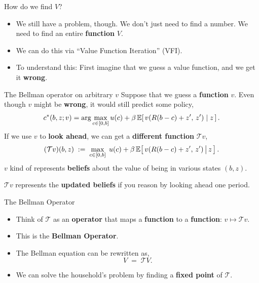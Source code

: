 \documentclass[10pt,aspectratio=169]{beamer}
\begin{document}
\begin{frame}{How do we find $V$?}
  \begin{itemize}
    \item We still have a problem, though. We don't just need to find a number. We need to find an entire \textbf{function} $V$.
    \item We can do this via ``Value Function Iteration'' (VFI).
    \item To understand this: First imagine that we guess a value function, and we get it \textbf{wrong}.
  \end{itemize}

\end{frame}

\begin{frame}{The Bellman operator on arbitrary $v$}
  Suppose that we guess a \textbf{function} $v$. Even though $v$ might be \textbf{wrong}, it would still predict some policy,
  \[
    c^*(b, z; v) = \arg\max_{c \in [0, b]} u(c) + \beta \, \mathbb{E}\!\left[\, v(R(b-c) + z',\, z') \mid z \,\right].
  \]
  If we use $v$ to \textbf{look ahead}, we can get a \textbf{different function} $\mathcal{T}v$,
  \[
    (\mathcal{T} v)(b, z) \;:=\; \max_{c \in [0, b]} \; u(c) + \beta \, \mathbb{E}\!\left[\, v(R(b-c) + z',\, z') \,\big|\, z \,\right].
  \]
  $v$ kind of represents \textbf{beliefs} about the value of being in various states $(b, z)$.

  $\mathcal{T}v$ represents the \textbf{updated beliefs} if you reason by looking ahead one period.
\end{frame}

\begin{frame}{The Bellman Operator}
  \begin{itemize}
    \item Think of $\mathcal{T}$ as an \textbf{operator} that maps a \textbf{function} to a \textbf{function}: $v \mapsto \mathcal{T}v$.
    \item This is the \textbf{Bellman Operator}.
    \item The Bellman equation can be rewritten as,
    \[
      \boxed{\; V \;=\; \mathcal{T} V. \;}
    \]
    \item We can solve the household's problem by finding a \textbf{fixed point} of $\mathcal{T}$.
  \end{itemize}
\end{frame}
\end{document}
